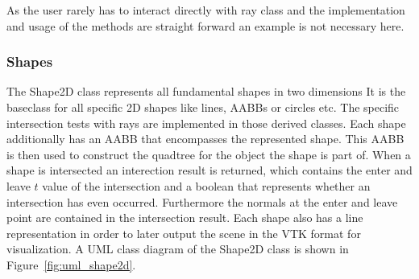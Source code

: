 \documentclass[a4paper,10pt]{article}
\newcommand{\figref}[1]{Figure~\ref{#1}}
\begin{document}
    As the user rarely has to interact directly with ray class and
    the implementation and usage of the methods are straight forward
    an example is not necessary here.
    
    \subsubsection{Shapes}

    The Shape2D class represents all fundamental shapes in two dimensions
    It is the baseclass for all specific 2D shapes like lines, AABBs or circles
    etc.
    The specific intersection tests with rays are implemented in those derived
    classes.
    Each shape additionally has an AABB that encompasses the represented
    shape.
    This AABB is then used to construct the quadtree for the object the shape
    is part of.
    When a shape is intersected an interection result is returned, which
    contains the enter and leave $t$ value of the intersection and a boolean
    that represents whether an intersection has even occurred.
    Furthermore the normals at the enter and leave point are contained
    in the intersection result.
    Each shape also has a line representation in order to later output
    the scene in the VTK format for visualization.
    A UML class diagram of the Shape2D class is shown in 
    \figref{fig:uml_shape2d}.
\end{document}
